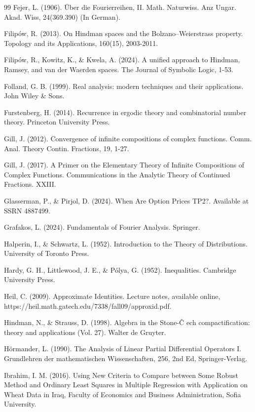 \documentclass[onecolumn]{article}
\begin{document}
\begin{thebibliography}{99}
\bibitem{[51]} Fejer, L. (1906). \"{U}ber die Fourierreihen, II. Math.
Naturwiss. Anz Ungar. Akad. Wiss, 24(369.390) (In German).

\bibitem{[55]} Filip{\'{o}}w, R. (2013). On Hindman spaces and the
Bolzano--Weierstrass property. Topology and its Applications, 160(15),
2003-2011.

\bibitem{[56]} Filip{\'{o}}w, R., Kowitz, K., \& Kwela, A. (2024). A unified
approach to Hindman, Ramsey, and van der Waerden spaces. The Journal of
Symbolic Logic, 1-53.

\bibitem{[19]} Folland, G. B. (1999). Real analysis: modern techniques and
their applications. John Wiley \& Sons.

\bibitem{[58]} Furstenberg, H. (2014). Recurrence in ergodic theory and
combinatorial number theory. Princeton University Press.

\bibitem{[52]} Gill, J. (2012). Convergence of infinite compositions of
complex functions. Comm. Anal. Theory Contin. Fractions, 19, 1-27.

\bibitem{[54]} Gill, J. (2017). A Primer on the Elementary Theory of
Infinite Compositions of Complex Functions. Communications in the Analytic
Theory of Continued Fractions. XXIII.

\bibitem{[37]} Glasserman, P., \& Pirjol, D. (2024). When Are Option Prices
TP2?. Available at SSRN 4887499.

\bibitem{[73]} Grafakos, L. (2024). Fundamentals of Fourier Analysis.
Springer.

\bibitem{[12]} Halperin, I., \& Schwartz, L. (1952). Introduction to the
Theory of Distributions. University of Toronto Press.

\bibitem{[66]} Hardy, G. H., Littlewood, J. E., \& P\'{o}lya, G. (1952).
Inequalities. Cambridge University Press.

\bibitem{[72]} Heil, C. (2009). Approximate Identities. Lecture notes,
available online, https://heil.math.gatech.edu/7338/fall09/approxid.pdf.

\bibitem{[57]} Hindman, N., \& Strauss, D. (1998). Algebra in the Stone-\v{C}%
ech compactification: theory and applications (Vol. 27). Walter de Gruyter.

\bibitem{[21]} H\"{o}rmander, L. (1990). The Analysis of Linear Partial
Differential Operators I. Grundlehren der mathematischen Wissenschaften,
256, 2nd Ed, Springer-Verlag.

\bibitem{[41]} Ibrahim, I. M. (2016). Using New Criteria to Compare between
Some Robust Method and Ordinary Least Squares in Multiple Regression with
Application on Wheat Data in Iraq, Faculty of Economics and Business
Administration, Sofia University.


\end{thebibliography}
\end{document}

